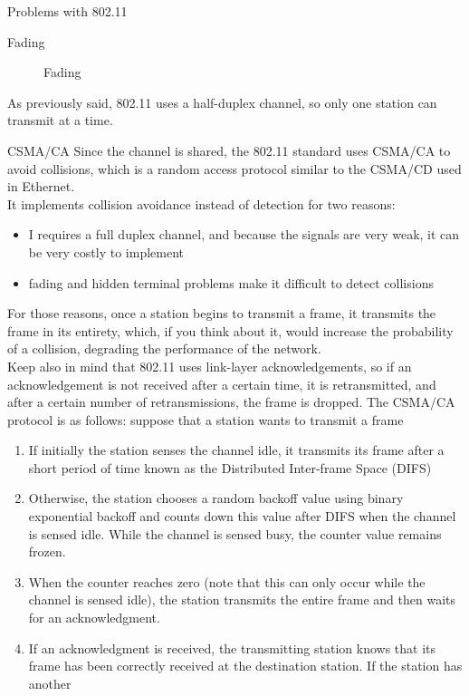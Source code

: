 \begin{section}{Problems with 802.11}
\begin{subsection}{Fading}
\begin{figure}[h]
      \caption{Fading}
      \label{fig:fading}
    \end{figure}
  \end{subsection}
  As previously said, 802.11 uses a half-duplex channel, so only one station can transmit at a time.
  \begin{subsection}{CSMA/CA}
    \label{sub:CSMA/CA}
    Since the channel is shared, the 802.11 standard uses CSMA/CA to avoid collisions, which is a 
    random access protocol similar to the CSMA/CD used in Ethernet.\\
    It implements collision avoidance instead of detection for two reasons:
    \begin{itemize}
      \item I requires a full duplex channel, and because the signals are very weak, it can be very
        costly to implement
      \item fading and hidden terminal problems make it difficult to detect collisions
    \end{itemize}
    For those reasons, once a station begins to transmit a frame, it transmits the frame in its 
    entirety, which, if you think about it, would increase the probability of a collision, degrading
    the performance of the network.\\
    Keep also in mind that 802.11 uses link-layer acknowledgements, so if an acknowledgement is not
    received after a certain time, it is retransmitted, and after a certain number of retransmissions,
    the frame is dropped.
    The CSMA/CA protocol is as follows: suppose that a station wants to transmit a frame
    \begin{enumerate}
      \item If initially the station senses the channel idle, it transmits its frame after a short 
        period of time known as the Distributed Inter-frame Space (DIFS)
      \item Otherwise, the station chooses a random backoff value using binary exponential backoff 
         and counts down this value after DIFS when the channel is sensed idle. While the channel 
         is sensed busy, the counter value remains frozen.
      \item When the counter reaches zero (note that this can only occur while the channel is 
        sensed idle), the station transmits the entire frame and then waits for an acknowledgment.
      \item If an acknowledgment is received, the transmitting station knows that its frame has 
        been correctly received at the destination station. If the station has another 

\end{enumerate}
\end{subsection}
\end{section}
